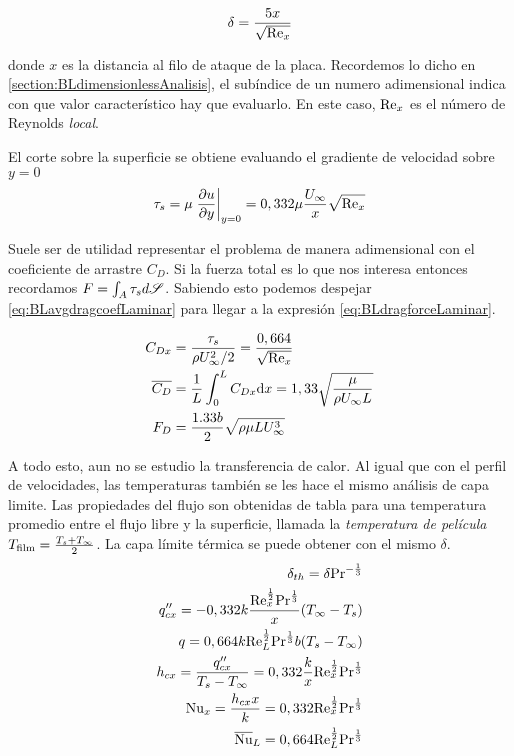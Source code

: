\begin{equation}\label{eq:BLthicknessLaminar}
    \delta=\frac{5x}{\sqrt{\textrm{Re}_x}}
\end{equation}

donde $x$ es la distancia al filo de ataque de la placa. Recordemos lo dicho en \ref{section:BLdimensionlessAnalisis}, el subíndice de un numero adimensional indica con que valor característico hay que evaluarlo. En este caso, $\textrm{Re}_x$ es el número de Reynolds \emph{local}.

El corte sobre la superficie se obtiene evaluando el gradiente de velocidad sobre $y=0$
\begin{equation} \label{eq:BLshearLaminar}
    \tau_s=\mu\left. \frac{\partial u}{\partial y}\right|_{y=0}=0,332\mu\frac{U_\infty}{x}\sqrt{\textrm{Re}_x}
\end{equation}

Suele ser de utilidad representar el problema de manera adimensional con el coeficiente de arrastre $C_D$. Si la fuerza total es lo que nos interesa entonces recordamos $F=\int_A \tau_s d\mathscr{S}$. Sabiendo esto podemos despejar \ref{eq:BLavgdragcoefLaminar} para llegar a la expresión \ref{eq:BLdragforceLaminar}.

\begin{align}\label{eq:BLdragcoefLaminar}
    C_{Dx}&=\frac{\tau_s}{\rho U^2_\infty/2}=\frac{0,664}{\sqrt{\textrm{Re}_x}} \\
   \label{eq:BLavgdragcoefLaminar} \overline{C_D}&=\frac{1}{L}\int^{L}_0 C_{Dx} \textrm{d} x=1,33\sqrt{\frac{\mu}{\rho U_\infty L}}\\
   \label{eq:BLdragforceLaminar} F_D&=\frac{1.33b}{2}\sqrt{\rho \mu L U_\infty^3}
\end{align}

A todo esto, aun no se estudio la transferencia de calor. Al igual que con el perfil de velocidades, las temperaturas también se les hace el mismo análisis de capa limite. Las propiedades del flujo son obtenidas de tabla para una temperatura promedio entre el flujo libre y la superficie, llamada la \emph{temperatura de película} $T_{\textrm{film}}=\frac{T_s+T_\infty}{2}$. La capa límite térmica se puede obtener con el mismo $\delta$. 
\begin{align} \label{eq:BLTthickness}
    \delta_{th}=\delta \textrm{Pr}^{-\frac{1}{3}}\\
    q^{\prime \prime}_{cx}=-0,332 k\frac{\textrm{Re}_x^{\frac{1}{2}} \textrm{Pr}^{\frac{1}{3}}}{x}(T_\infty-T_s)\\
    q=0,664k\textrm{Re}_L^{\frac{1}{2}} \textrm{Pr}^{\frac{1}{3}}b(T_s-T_\infty)\\
    h_{cx}=\frac{q^{\prime \prime}_{cx}}{T_s-T_\infty}=0,332 \frac{k}{x}\textrm{Re}_x^{\frac{1}{2}} \textrm{Pr}^{\frac{1}{3}}\\
    \textrm{Nu}_x=\frac{h_{cx}x}{k}=0,332 \textrm{Re}_x^{\frac{1}{2}} \textrm{Pr}^{\frac{1}{3}}\\
    \overline{\textrm{Nu}}_L=0,664\textrm{Re}_L^{\frac{1}{2}} \textrm{Pr}^{\frac{1}{3}}
\end{align}

